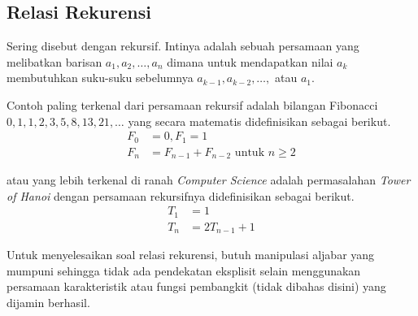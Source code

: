 \subsection{Relasi Rekurensi}
Sering disebut dengan rekursif. Intinya adalah sebuah persamaan yang melibatkan barisan $a_1, a_2, \dots , a_n$ dimana untuk mendapatkan nilai $a_k$ membutuhkan suku-suku sebelumnya $a_{k-1}, a_{k-2}, \dots,$ atau $a_1$. 

Contoh paling terkenal dari persamaan rekursif adalah bilangan Fibonacci $0,1,1,2,3,5,8,13,21,\dots$ yang secara matematis didefinisikan sebagai berikut.
\begin{align*}
    F_0 &= 0, F_1 = 1\\
    F_n &= F_{n-1}+F_{n-2} \text{ untuk } n \ge 2
\end{align*}

atau yang lebih terkenal di ranah \textit{Computer Science} adalah permasalahan \textit{Tower of Hanoi} dengan persamaan rekursifnya didefinisikan sebagai berikut.
\begin{align*}
    T_1 &= 1 \\
    T_n &= 2T_{n-1}+1
\end{align*}

Untuk menyelesaikan soal relasi rekurensi, butuh manipulasi aljabar yang mumpuni sehingga tidak ada pendekatan eksplisit selain menggunakan persamaan karakteristik atau fungsi pembangkit (tidak dibahas disini) yang dijamin berhasil.



